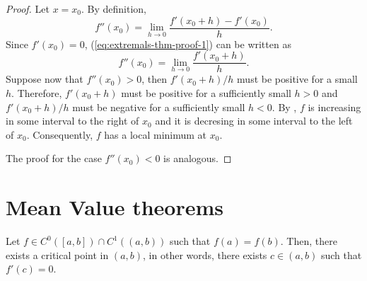 \begin{proof}
    Let $x = x_0$. By definition,
    \begin{equation}\label{eq:extremals-thm-proof-1}
        f''\left( x_0 \right) = \lim_{h\to 0}\frac{f'\left( x_0 + h \right) - f'\left( x_0 \right) }{h}.
    \end{equation}
    Since $f'\left( x_0 \right) = 0$, (\ref{eq:extremals-thm-proof-1}) can be written as
    \begin{equation}
        f''\left( x_0 \right) = \lim_{h\to 0}\frac{f'\left( x_0 + h \right) }{h}.
    \end{equation}
    Suppose now that $f''\left( x_0 \right) > 0$, then $f'\left( x_0 + h \right) / h$ must be positive for a
    small $h$. Therefore, $f'\left( x_0 + h \right)$ must be positive for a sufficiently small $h > 0$ and
    $f'\left( x_0 + h \right) / h$ must be negative for a sufficiently small $h < 0$. By , $f$ is increasing in some interval to the right of $x_0$ and it is decresing in some interval to the
    left of $x_0$. Consequently, $f$ has a local minimum at $x_0$.

    \noindent The proof for the case $f''\left( x_0 \right) < 0$ is analogous.
\end{proof}


\section{Mean Value theorems}
\begin{theorem}\label{thm:rolle}
    Let $f\in C^0\left( [a, b] \right) \cap C^1\left(\left( a, b \right)\right) $ such that $f\left( a \right)  = f\left( b \right) $. Then, there exists a critical point in $\left( a, b \right) $, in other words,
    there exists $c\in \left( a, b \right) $ such that $f'\left( c \right) = 0$.
\end{theorem}

